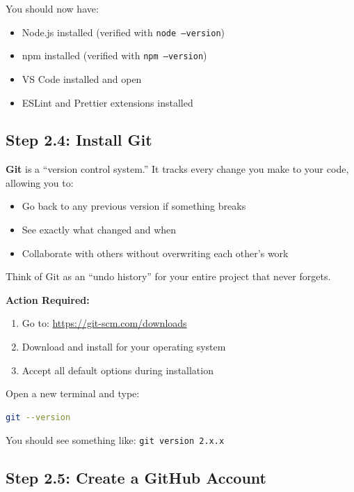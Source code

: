 \documentclass[12pt,a4paper]{article}
\begin{document}
\begin{checkpoint}
You should now have:
\begin{itemize}
    \item[$\square$] Node.js installed (verified with \texttt{node --version})
    \item[$\square$] npm installed (verified with \texttt{npm --version})
    \item[$\square$] VS Code installed and open
    \item[$\square$] ESLint and Prettier extensions installed
\end{itemize}
\end{checkpoint}

\subsection{Step 2.4: Install Git}

\begin{concept}
\textbf{Git} is a ``version control system.'' It tracks every change you make to your code, allowing you to:
\begin{itemize}
    \item Go back to any previous version if something breaks
    \item See exactly what changed and when
    \item Collaborate with others without overwriting each other's work
\end{itemize}

Think of Git as an ``undo history'' for your entire project that never forgets.
\end{concept}

\textbf{Action Required:}
\begin{enumerate}
    \item Go to: \url{https://git-scm.com/downloads}
    \item Download and install for your operating system
    \item Accept all default options during installation
\end{enumerate}

\begin{checkpoint}
Open a new terminal and type:
\begin{lstlisting}[language=bash]
git --version
\end{lstlisting}
You should see something like: \texttt{git version 2.x.x}
\end{checkpoint}

\subsection{Step 2.5: Create a GitHub Account}
\end{document}
